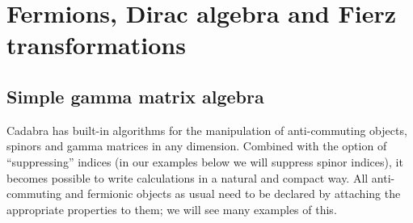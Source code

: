 \documentclass[11pt]{article}
\newcommand{\Cdb}{{Cadabra}\xspace}
\begin{document}
\vfill\eject
\section{Fermions, Dirac algebra and Fierz transformations}
\label{s:fermions}
\subsection{Simple gamma matrix algebra}
\label{s:gamma}

\Cdb has built-in algorithms for the manipulation of anti-commuting
objects, spinors and gamma matrices in any dimension. Combined with
the option of ``suppressing'' indices (in our examples below we will
suppress spinor indices), it becomes possible to write calculations in
a natural and compact way. All anti-commuting and fermionic objects as
usual need to be declared by attaching the appropriate properties to
them; we will see many examples of this.
\end{document}
